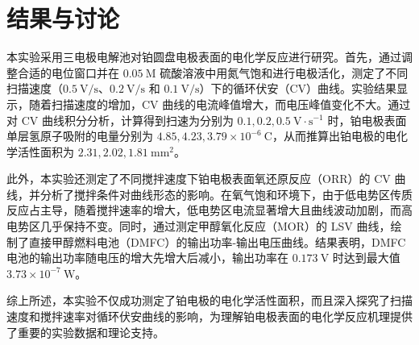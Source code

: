 \section{结果与讨论}

本实验采用三电极电解池对铂圆盘电极表面的电化学反应进行研究。首先，通过调整合适的电位窗口并在 $0.05\ \mathrm{M}$ 硫酸溶液中用氮气饱和进行电极活化，测定了不同扫描速度（$0.5\ \mathrm{V/s}$、$0.2\ \mathrm{V/s}$ 和 $0.1\ \mathrm{V/s}$）下的循环伏安（CV）曲线。实验结果显示，随着扫描速度的增加，CV 曲线的电流峰值增大，而电压峰值变化不大。通过对 CV 曲线积分分析，计算得到扫速为分别为 $0.1,0.2,0.5\mathrm{~V\cdot s^{-1}}$ 时，铂电极表面单层氢原子吸附的电量分别为 $4.85,4.23,3.79 \times 10^{-6}\ \mathrm{C}$，从而推算出铂电极的电化学活性面积为 $2.31, 2.02, 1.81\ \mathrm{mm}^2$。

此外，本实验还测定了不同搅拌速度下铂电极表面氧还原反应（ORR）的 CV 曲线，并分析了搅拌条件对曲线形态的影响。在氧气饱和环境下，由于低电势区传质反应占主导，随着搅拌速率的增大，低电势区电流显著增大且曲线波动加剧，而高电势区几乎保持不变。同时，通过测定甲醇氧化反应（MOR）的 LSV 曲线，绘制了直接甲醇燃料电池（DMFC）的输出功率-输出电压曲线。结果表明，DMFC 电池的输出功率随电压的增大先增大后减小，输出功率在 $0.173\ \mathrm{V}$ 时达到最大值 $3.73 \times 10^{-7}\ \mathrm{W}$。

综上所述，本实验不仅成功测定了铂电极的电化学活性面积，而且深入探究了扫描速度和搅拌速率对循环伏安曲线的影响，为理解铂电极表面的电化学反应机理提供了重要的实验数据和理论支持。


